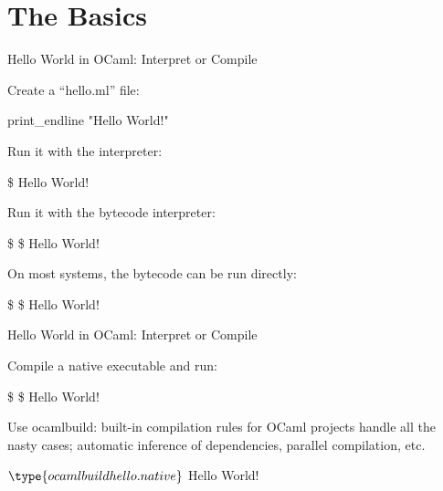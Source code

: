 \documentclass{plt}
\begin{document}
\part{The Basics}

\begin{frame}[fragile]{Hello World in OCaml: Interpret or Compile}

Create a ``hello.ml'' file:

\begin{ocaml}
print_endline "Hello World!"
\end{ocaml}

Run it with the interpreter:

\begin{interactive}
\$ 
Hello World!
\end{interactive}

\vspace{-15pt}
Run it with the \alert{bytecode} interpreter:
\begin{interactive}
\$ 
\$ 
Hello World!
\end{interactive}

\vspace{-15pt}
On most systems, the bytecode can be run directly:
\begin{interactive}
\$ 
\$ 
Hello World!
\end{interactive}
\end{frame}

\begin{frame}[fragile]{Hello World in OCaml: Interpret or Compile}

Compile a native executable and run:

\begin{interactive}
\$ 
\$ 
Hello World!
\end{interactive}
%

Use ocamlbuild: built-in compilation rules for OCaml projects handle all the nasty cases;
automatic inference of dependencies, parallel compilation, etc.

\begin{interactive}
$ \type{ocamlbuild hello.native}
$ 
Hello World!
\end{interactive}

\end{frame}
\end{document}
